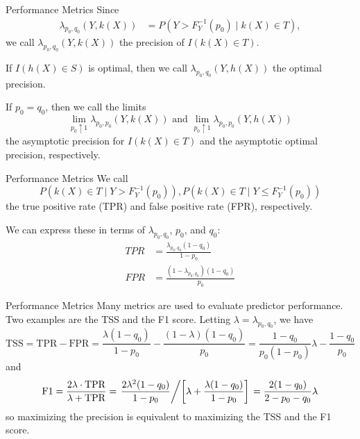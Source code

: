 \documentclass{beamer}
\begin{document}
\begin{frame}{Performance Metrics}
    Since
    \begin{align*}
        \lambda_{p_0, q_0}(Y, k(X)) &= P(Y > F_Y^{-1}(p_0) \mid k(X) \in T),
    \end{align*}
    we call $\lambda_{p_0, q_0}(Y, k(X))$ the precision of $I(k(X) \in T)$.

    \medskip
    
    If $I(h(X) \in S)$ is optimal, then we call $\lambda_{p_0, q_0}(Y, h(X))$ the optimal precision.

    \medskip
    
    If $p_0 = q_0$, then we call the limits
    \[
    \lim_{p_0 \uparrow 1} \lambda_{p_0, p_0}(Y, k(X)) \text{ and } \lim_{p_0 \uparrow 1} \lambda_{p_0, p_0}(Y, h(X))
    \]
    the asymptotic precision for $I(k(X) \in T)$ and the asymptotic optimal precision, respectively.
\end{frame}

\begin{frame}{Performance Metrics}
    We call
    \[
    P(k(X) \in T \mid Y > F_Y^{-1}(p_0)), P(k(X) \in T \mid Y \le F_Y^{-1}(p_0))
    \]
    the true positive rate (TPR) and false positive rate (FPR), respectively.

    \medskip
    
    We can express these in terms of $\lambda_{p_0, q_0}$, $p_0$, and $q_0$:
    \begin{align*}
        TPR &= \frac{\lambda_{p_0, q_0}(1 - q_0)}{1 - p_0} \\
        FPR &= \frac{(1 - \lambda_{p_0, q_0})(1 - q_0)}{p_0}
    \end{align*}
\end{frame}

\begin{frame}{Performance Metrics}
    Many metrics are used to evaluate predictor performance. Two examples are the TSS and the F1 score. Letting $\lambda = \lambda_{p_0, q_0}$, we have
    \[
    \text{TSS} = \text{TPR} - \text{FPR} = \frac{\lambda(1 - q_0)}{1 - p_0} - \frac{(1 - \lambda)(1 - q_0)}{p_0} = \frac{1 - q_0}{p_0(1 - p_0)}\lambda - \frac{1 - q_0}{p_0}
    \]
    and
    \[
    \text{F1} = \frac{2\lambda \cdot \text{TPR}}{\lambda + \text{TPR}} = \left.\frac{2\lambda^2(1 - q_0)}{1 - p_0} \middle/ \left[\lambda + \frac{\lambda(1 - q_0)}{1 - p_0}\right]\right. = \frac{2(1 - q_0)}{2 - p_0 - q_0}\lambda
    \]
    so maximizing the precision is equivalent to maximizing the TSS and the F1 score.
\end{frame}
\end{document}
